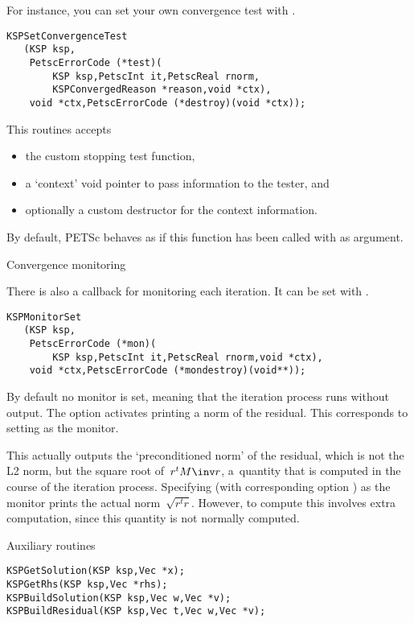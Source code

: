 For instance, you can set your own convergence test with
.
\begin{lstlisting}
KSPSetConvergenceTest
   (KSP ksp,
    PetscErrorCode (*test)(
        KSP ksp,PetscInt it,PetscReal rnorm,
        KSPConvergedReason *reason,void *ctx),
    void *ctx,PetscErrorCode (*destroy)(void *ctx));
\end{lstlisting}
This routines accepts
\begin{itemize}
\item the custom stopping test function,
\item a `context' void pointer to pass information to the tester, and
\item optionally a custom destructor for the context information.
\end{itemize}
By default, PETSc behaves as if this function has been called with
 as argument.

 {Convergence monitoring}

There is also a callback for monitoring each iteration.
It can be set with .
\begin{lstlisting}
KSPMonitorSet
   (KSP ksp,
    PetscErrorCode (*mon)(
        KSP ksp,PetscInt it,PetscReal rnorm,void *ctx),
    void *ctx,PetscErrorCode (*mondestroy)(void**));
\end{lstlisting}
By default no monitor is set, meaning that the iteration process
runs without output.
The option  activates printing
a norm of the residual.
This corresponds to setting 
as the monitor.

This actually outputs the `preconditioned norm' of the residual,
which is not the L2 norm, but the square root of~$r^tM\inv r$,
a~quantity that is computed in the course of the iteration process.
Specifying 
(with corresponding option )
as the monitor prints the actual norm~$\sqrt{r^tr}$.
However, to compute this involves extra computation,
since this quantity is not normally computed.

 {Auxiliary routines}

\begin{lstlisting}
KSPGetSolution(KSP ksp,Vec *x);
KSPGetRhs(KSP ksp,Vec *rhs);
KSPBuildSolution(KSP ksp,Vec w,Vec *v);
KSPBuildResidual(KSP ksp,Vec t,Vec w,Vec *v);
\end{lstlisting}

